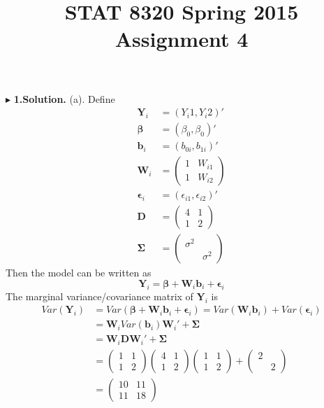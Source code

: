 \documentclass[letterpaper, 12pt]{article}
\newcommand{\ba}{$$\begin{aligned}}
\newcommand{\ea}{\end{aligned}$$}
\begin{document}
\title{STAT 8320 Spring 2015 Assignment 4}
\author{}
\maketitle
\indent




$\blacktriangleright$ \textbf{1.\quad Solution.} 
(a). Define
\ba
\bm{Y}_i&=(Y_i1,Y_i2)'\\
\bm{\beta}&=(\beta_0,\beta_0)'\\
\bm{b}_i&=(b_{0i},b_{1i})'\\
\bm{W}_i&=\left(\begin{matrix}
1&W_{i1}\\
1&W_{i2}
\end{matrix}\right)\\
\bm{\epsilon}_i&=(\epsilon_{i1},\epsilon_{i2})'\\
\bm{D}&=\left(\begin{matrix}
4 &1\\
1 &2
\end{matrix}\right)\\
\bm{\Sigma}&=\left(\begin{matrix}
\sigma^2\\
&\sigma^2
\end{matrix}\right)
\ea
Then the model can be written as
$$
\bm{Y}_i=\bm{\beta}+\bm{W}_i\bm{b}_i+\bm{\epsilon}_i
$$
The marginal variance/covariance matrix of $\bm{Y}_i$ is 
\ba
Var(\bm{Y}_i)&=Var(\bm{\beta}+\bm{W}_i\bm{b}_i+\bm{\epsilon}_i)=Var(\bm{W}_i\bm{b}_i)+Var(\bm{\epsilon}_i)\\
&=\bm{W}_iVar(\bm{b}_i)\bm{W}_i'+\bm{\Sigma}\\
&=\bm{W}_i\bm{D}\bm{W}_i'+\bm{\Sigma}\\
&=\left(\begin{matrix}
1&1\\
1&2
\end{matrix}\right)\left(\begin{matrix}
4&1\\
1&2
\end{matrix}\right)\left(\begin{matrix}
1&1\\
1&2
\end{matrix}\right)+\left(\begin{matrix}
2\\
&2
\end{matrix}\right)\\
&=\left(\begin{matrix}
10&11\\
11&18
\end{matrix}\right)
\ea
\end{document}
